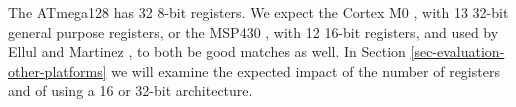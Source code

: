 The ATmega128 has 32 8-bit registers. We expect the Cortex M0 \cite{ARM:2009vz}, with 13 32-bit general purpose registers, or the MSP430 \cite{TexasInstrumentsIncorporated:MSP430F1611Datasheet}, with 12 16-bit registers, and used by Ellul and Martinez \cite{Ellul:2010iw}, to both be good matches as well. In Section \ref{sec-evaluation-other-platforms} we will examine the expected impact of the number of registers and of using a 16 or 32-bit architecture.
